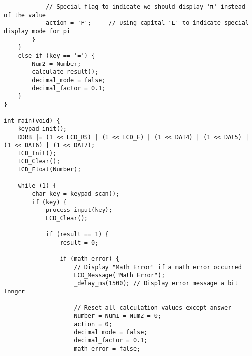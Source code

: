 \documentclass{article}
\begin{document}
\begin{verbatim}
            // Special flag to indicate we should display 'π' instead of the value
            action = 'P';     // Using capital 'L' to indicate special display mode for pi
        }
    }
    else if (key == '=') {
        Num2 = Number;
        calculate_result();
        decimal_mode = false;
        decimal_factor = 0.1;
    }
}

int main(void) {
    keypad_init();
    DDRB |= (1 << LCD_RS) | (1 << LCD_E) | (1 << DAT4) | (1 << DAT5) | (1 << DAT6) | (1 << DAT7);
    LCD_Init();
    LCD_Clear();
    LCD_Float(Number);

    while (1) {
        char key = keypad_scan();
        if (key) {
            process_input(key);
            LCD_Clear();

            if (result == 1) {
                result = 0;
                
                if (math_error) {
                    // Display "Math Error" if a math error occurred
                    LCD_Message("Math Error");
                    _delay_ms(1500); // Display error message a bit longer
                    
                    // Reset all calculation values except answer
                    Number = Num1 = Num2 = 0;
                    action = 0;
                    decimal_mode = false;
                    decimal_factor = 0.1;
                    math_error = false;
                    

\end{verbatim}
\end{document}
